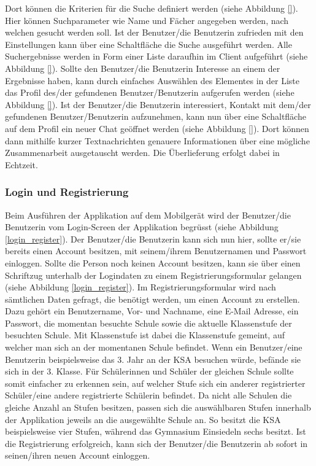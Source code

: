 \documentclass[../main.tex]{subfiles}
\begin{document}
Dort können die Kriterien für die Suche definiert werden (siehe Abbildung \ref{}). Hier können Suchparameter wie Name und Fächer angegeben werden, nach welchen gesucht werden soll. Ist der Benutzer/die Benutzerin zufrieden mit den Einstellungen kann über eine Schaltfläche die Suche ausgeführt werden. Alle Suchergebnisse werden in Form einer Liste daraufhin im Client aufgeführt (siehe Abbildung \ref{}). Sollte den Benutzer/die Benutzerin Interesse an einem der Ergebnisse haben, kann durch einfaches Auswählen des Elementes in der Liste das Profil des/der gefundenen Benutzer/Benutzerin aufgerufen werden (siehe Abbildung \ref{}). Ist der Benutzer/die Benutzerin interessiert, Kontakt mit dem/der gefundenen Benutzer/Benutzerin aufzunehmen, kann nun über eine Schaltfläche auf dem Profil ein neuer Chat geöffnet werden (siehe Abbildung \ref{}). Dort können dann mithilfe kurzer Textnachrichten genauere Informationen über eine mögliche Zusammenarbeit ausgetauscht werden. Die Überlieferung erfolgt dabei in Echtzeit.


\subsubsection*{Login und Registrierung}
Beim Ausführen der Applikation auf dem Mobilgerät wird der Benutzer/die Benutzerin vom Login-Screen der Applikation begrüsst (siehe Abbildung \ref{login_register}). Der Benutzer/die Benutzerin kann sich nun hier, sollte er/sie bereits einen Account besitzen, mit seinem/ihrem Benutzernamen und Passwort einloggen. Sollte die Person noch keinen Account besitzen, kann sie über einen Schriftzug unterhalb der Logindaten zu einem Registrierungsformular gelangen (siehe Abbildung \ref{login_register}). Im Registrierungsformular wird nach sämtlichen Daten gefragt, die benötigt werden, um einen Account zu erstellen. Dazu gehört ein Benutzername, Vor- und Nachname, eine E-Mail Adresse, ein Passwort, die momentan besuchte Schule sowie die aktuelle Klassenstufe der besuchten Schule. Mit Klassenstufe ist dabei die Klassenstufe gemeint, auf welcher man sich an der momentanen Schule befindet. Wenn ein Benutzer/eine Benutzerin beispielsweise das 3. Jahr an der KSA besuchen würde, befände sie sich in der 3. Klasse. Für Schülerinnen und Schüler der gleichen Schule sollte somit einfacher zu erkennen sein, auf welcher Stufe sich ein anderer registrierter Schüler/eine andere registrierte Schülerin befindet. Da nicht alle Schulen die gleiche Anzahl an Stufen besitzen, passen sich die auswählbaren Stufen innerhalb der Applikation jeweils an die ausgewählte Schule an. So besitzt die KSA beispielsweise vier Stufen, während das Gymnasium Einsiedeln sechs besitzt. Ist die Registrierung erfolgreich, kann sich der Benutzer/die Benutzerin ab sofort in seinen/ihren neuen Account einloggen.
\end{document}
